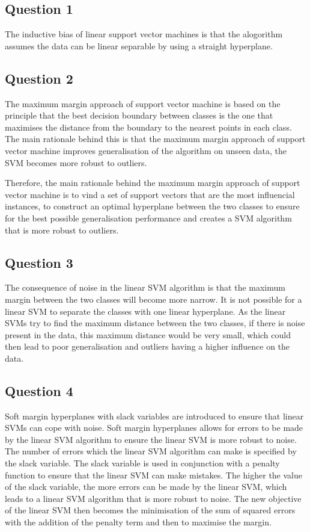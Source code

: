 \documentclass[10pt]{article}
\begin{document}
\subsection*{Question 1}

The inductive bias of linear support vector machines is that the alogorithm
assumes the data can be linear separable by using a straight hyperplane.

\subsection*{Question 2}

The maximum margin approach of support vector machine is based on the principle
that the best decision boundary between classes is the one that maximises the distance from the
boundary to the nearest points in each class. The main rationale behind this is that the
maximum margin approach of support vector machine improves generalisation of the algorithm on unseen
data, the SVM becomes more robust to outliers.

Therefore, the main rationale behind the maximum margin approach of support vector machine
is to vind a set of support vectors that are the most influencial instances, to construct an optimal
hyperplane between the two classes to ensure for the best possible generalisation performance and
creates a SVM algorithm that is more robust to outliers.

\subsection*{Question 3}

The consequence of noise in the linear SVM algorithm is that
the maximum margin between the two classes will become more narrow. It is not possible for a linear
SVM to separate the classes with one linear hyperplane. As the linear SVMs try to find
the maximum distance between the two classes, if there is noise present in the data, this maximum distance
would be very small, which could then lead to poor generalisation and outliers having a higher influence on the data.

\subsection*{Question 4}

Soft margin hyperplanes with slack variables are introduced to ensure that linear SVMs can cope with noise.
Soft margin hyperplanes allows for errors to be made by the linear SVM algorithm to ensure the linear
SVM is more robust to noise. The number of errors which the linear SVM algorithm can make is specified
by the slack variable. The slack variable is used in conjunction with a penalty function to ensure that
the linear SVM can make mistakes. The higher the value of the slack variable, the more errors can be made by the
linear SVM, which leads to a linear SVM algorithm that is more robust to noise. The new objective of the linear SVM then becomes
the minimisation of the sum of squared errors with the addition of the penalty term and then to maximise the margin.
\end{document}
